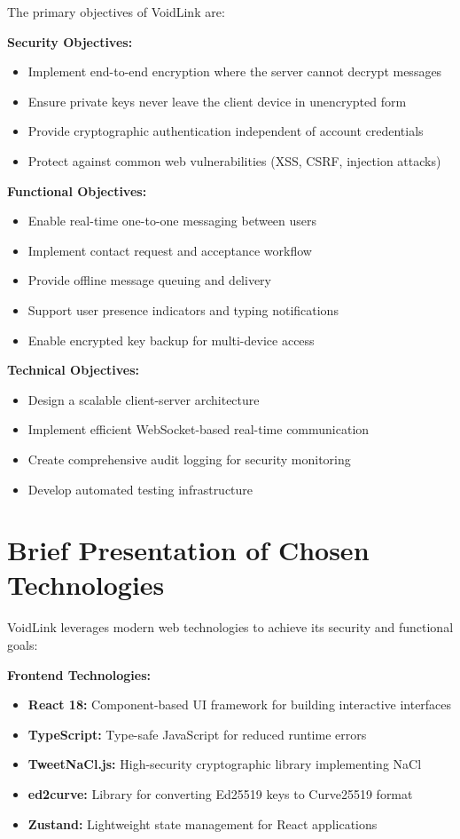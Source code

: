 The primary objectives of VoidLink are:

\textbf{Security Objectives:}
\begin{itemize}
    \item Implement end-to-end encryption where the server cannot decrypt messages
    \item Ensure private keys never leave the client device in unencrypted form
    \item Provide cryptographic authentication independent of account credentials
    \item Protect against common web vulnerabilities (XSS, CSRF, injection attacks)
\end{itemize}

\textbf{Functional Objectives:}
\begin{itemize}
    \item Enable real-time one-to-one messaging between users
    \item Implement contact request and acceptance workflow
    \item Provide offline message queuing and delivery
    \item Support user presence indicators and typing notifications
    \item Enable encrypted key backup for multi-device access
\end{itemize}

\textbf{Technical Objectives:}
\begin{itemize}
    \item Design a scalable client-server architecture
    \item Implement efficient WebSocket-based real-time communication
    \item Create comprehensive audit logging for security monitoring
    \item Develop automated testing infrastructure
\end{itemize}

\section*{Brief Presentation of Chosen Technologies}

VoidLink leverages modern web technologies to achieve its security and functional goals:

\textbf{Frontend Technologies:}
\begin{itemize}
    \item \textbf{React 18:} Component-based UI framework for building interactive interfaces
    \item \textbf{TypeScript:} Type-safe JavaScript for reduced runtime errors
    \item \textbf{TweetNaCl.js:} High-security cryptographic library implementing NaCl
    \item \textbf{ed2curve:} Library for converting Ed25519 keys to Curve25519 format
    \item \textbf{Zustand:} Lightweight state management for React applications
\end{itemize}


